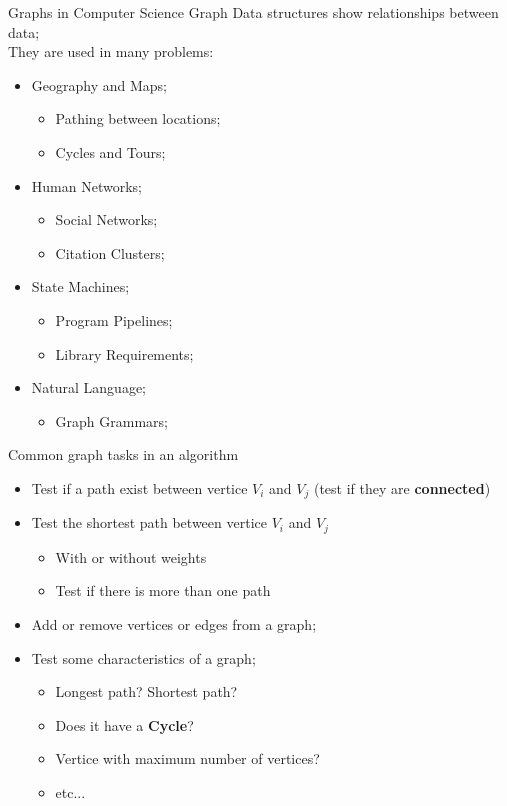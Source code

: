 \begin{frame}{Graphs in Computer Science}
  Graph Data structures show relationships between data;\\
  They are used in many problems:\bigskip

  \begin{itemize}
    \item Geography and Maps;
    \begin{itemize}
      \item Pathing between locations;
      \item Cycles and Tours;
    \end{itemize}
    \item Human Networks;
    \begin{itemize}
      \item Social Networks;
      \item Citation Clusters;
    \end{itemize}
    \item State Machines;
    \begin{itemize}
      \item Program Pipelines;
      \item Library Requirements;
    \end{itemize}
    \item Natural Language;
    \begin{itemize}
      \item Graph Grammars;
    \end{itemize}
  \end{itemize}
\end{frame}


\begin{frame}{Common graph tasks in an algorithm}
  \begin{itemize}
    \item Test if a path exist between vertice $V_i$ and $V_j$ (test if they are {\bf connected})
    \item Test the shortest path between vertice $V_i$ and $V_j$
    \begin{itemize}
      \item With or without weights
      \item Test if there is more than one path
    \end{itemize}
    \item Add or remove vertices or edges from a graph;
    \item Test some characteristics of a graph;
    \begin{itemize}
      \item Longest path? Shortest path?
      \item Does it have a {\bf Cycle}?
      \item Vertice with maximum number of vertices?
      \item etc...
    \end{itemize}
  \end{itemize}
\end{frame}

